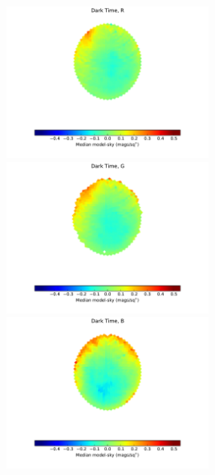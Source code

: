 \documentclass[]{spie}
\begin{document}
\begin{figure}[ht]
\begin{center}
  \includegraphics[height=5cm]{plots/medianResidMap_R.pdf}\includegraphics[height=5cm]{plots/medianResidMap_G.pdf}\includegraphics[height=5cm]{plots/medianResidMap_B.pdf} \\

\end{center}
\end{figure}
\end{document}
